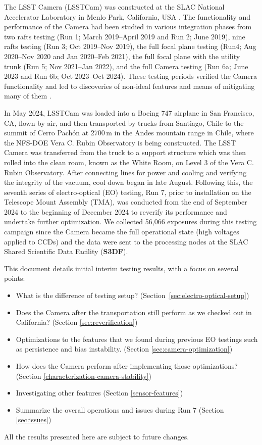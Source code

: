 
The LSST Camera (LSSTCam) was constructed at the SLAC National Accelerator Laboratory in Menlo Park, California, USA \citep{10.1117/12.3019302}.
The functionality and performance of the Camera had been studied in various integration phases from two rafts testing (Run 1; March 2019--April 2019 and Run 2; June 2019), nine rafts testing (Run 3; Oct 2019--Nov 2019), the full focal plane testing (Run4; Aug 2020--Nov 2020 and Jan 2020--Feb 2021), the full focal plane with the utility trunk (Run 5; Nov 2021--Jan 2022), and the full Camera testing (Run 6a; June 2023 and Run 6b; Oct 2023--Oct 2024)\citep{2024SPIE13096E..1SR}. These testing periods verified the Camera functionality and led to discoveries of non-ideal features and means of mitigating many of them \citep{2024SPIE13103E..0WU}.

In May 2024, LSSTCam was loaded into a Boeing 747 airplane in San Francisco, CA, flown by air, and then transported by trucks from Santiago, Chile to the summit of Cerro Pachón at 2700\,m in the Andes mountain range in Chile, where the NFS-DOE Vera C. Rubin Observatory is being constructed. The LSST Camera was transferred from the truck to a support structure which was then rolled into the clean room, known as the White Room, on Level 3 of the Vera C. Rubin Observatory. After connecting lines for power and cooling and verifying the integrity of the vacuum, cool down began in late August. Following this, the seventh series of electro-optical (EO) testing, Run 7, prior to installation on the Telescope Mount Assembly (TMA), was conducted from the end of September 2024 to the beginning of December 2024 to reverify its performance and undertake further optimization. We collected 56,066 exposures during this testing campaign since the Camera became the full operational state (high voltages applied to CCDs) and the data were sent to the processing nodes at the SLAC Shared Scientific Data Facility (\textbf{S3DF}).

This document details initial interim testing results, with a focus on several points:
\begin{itemize}
    \item What is the difference of testing setup? (Section~\ref{sec:electro-optical-setup})
    \item Does the Camera after the transportation still perform as we checked out in California? (Section \ref{sec:reverification})
    \item Optimizations to the features that we found during previous EO testings such as persistence and bias instability. (Section \ref{sec:camera-optimization})
    \item How does the Camera perform after implementing those optimizations? (Section \ref{characterization-camera-stability})
    \item Investigating other features (Section \ref{sensor-features})
    \item Summarize the overall operations and issues during Run 7 (Section \ref{sec:issues})
\end{itemize}
All the results presented here are subject to future changes.

